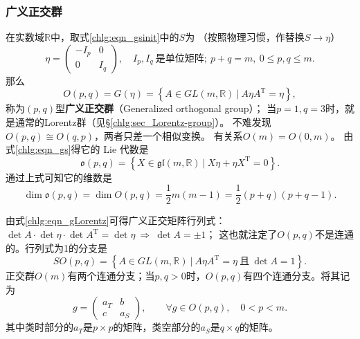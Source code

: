 \subsubsection{广义正交群}
在实数域$\mathbb{R}$中，取式\eqref{chlg:eqn_gsinit}中的$S$为
（按照物理习惯，作替换$S\to \eta$）
\begin{equation}
    \eta = \begin{pmatrix}
        -I_p & 0 \\  0 & I_q
    \end{pmatrix},
    \quad I_p,I_q \  \text{是单位矩阵};\
    p+q=m,\ 0\leqslant p,q\leqslant m .
\end{equation}
那么
\begin{equation}\label{chlg:eqn_gLorentz}
    O(p,q)=G(\eta)= \left\{ A \in GL(m,\mathbb{R})\ |\ A \eta {A}^{\mathrm{T}} =\eta \right\},
\end{equation}
称为$(p,q)$型\textbf{广义正交群}（Generalized orthogonal group）；
当$p=1,q=3$时，就是通常的Lorentz群（见\S\ref{chlg:sec_Lorentz-group}）。
不难发现$O(p,q)\cong O(q,p)$，两者只差一个相似变换。
有关系$O(m)= O(0,m)$。
由式\eqref{chlg:eqn_gs}得它的 Lie 代数是
\begin{equation}
    \mathfrak{o}(p,q)= \left\{ X \in
    \mathfrak{gl}(m,\mathbb{R})\ |\  X\eta + \eta {X}^{\mathrm{T}} =0 \right\}.
\end{equation}
通过上式可知它的维数是
\begin{equation}
    \dim  \mathfrak{o}(p,q) = \dim  O(p,q) =
    \frac{1}{2}m(m-1)=\frac{1}{2}(p+q)(p+q-1).
\end{equation}

由式\eqref{chlg:eqn_gLorentz}可得广义正交矩阵行列式：
$ \det A \cdot\det\eta\cdot \det A^{\mathrm{T}} = \det \eta \ \Rightarrow \ \det A = \pm 1$；
这也就注定了$O(p,q)$不是连通的。行列式为1的分支是
\begin{equation}
    SO(p,q)= \left\{ A \in GL(m,\mathbb{R})\ |\ A \eta {A}^{\mathrm{T}} =\eta
    \ \text{且}\ \det A = 1 \right\} .
\end{equation}
正交群$O(m)$有两个连通分支；当$p,q>0$时，$O(p,q)$有四个连通分支。将其记为
\begin{equation}
    g=\begin{pmatrix}
        a_T & b \\ c & a_S
    \end{pmatrix},
    \qquad \forall g\in O(p,q) ,\quad 0 < p < m.
\end{equation}
其中类时部分的$a_T$是$p\times p$的矩阵，类空部分的$a_S$是$q\times q$的矩阵。

